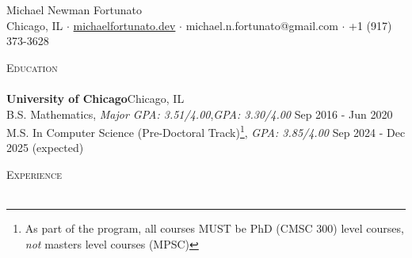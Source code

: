 \documentclass[a4paper]{article}
\newcommand{\lineunder} {
    \vspace*{-8pt} \\
    \hspace*{-18pt} \hrulefill \\
}
\newcommand{\header} [1] {
    {\hspace*{-18pt}\vspace*{6pt} \textsc{#1}}
    \vspace*{-6pt} \lineunder
}
\begin{document}
\vspace*{-40pt}



\vspace*{-10pt}
\begin{center}
	{\Huge {Michael Newman Fortunato}}\\
	Chicago, IL $\cdot$ \href{https://www.michaelfortunato.dev}{michaelfortunato.dev} $\cdot$  michael.n.fortunato@gmail.com $\cdot$ +1 (917) 373-3628 \end{center}

\header{Education}
\textbf{University of Chicago}\hfill Chicago, IL\\
B.S. Mathematics, \textit{Major GPA: 3.51/4.00},\textit{GPA: 3.30/4.00} \hfill Sep 2016 - Jun 2020\\
M.S. In Computer Science (Pre-Doctoral Track)\footnote{As part of the program, all courses MUST be PhD (CMSC 300) level courses, \textit{not} masters level courses (MPSC)}, \textit{GPA: 3.85/4.00} \hfill Sep 2024 - Dec 2025 (expected)\\
\vspace{2mm}

\header{Experience}
\vspace{1mm}
\end{document}
